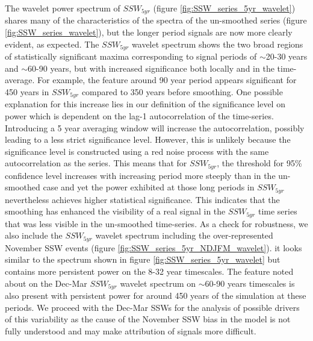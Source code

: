 The wavelet power spectrum of $SSW_{5yr}$ (figure \ref{fig:SSW_series_5yr_wavelet}) shares many of the characteristics of the spectra of the un-smoothed series (figure \ref{fig:SSW_series_wavelet}), but the longer period signals are now more clearly evident, as expected. The $SSW_{5yr}$ wavelet spectrum shows the two broad regions of statistically significant maxima corresponding to signal periods of $\sim$20-30 years and $\sim$60-90 years, but with increased significance both locally and in the time-average. For example, the feature around 90 year period appears significant for 450 years in $SSW_{5yr}$ compared to 350 years before smoothing. One possible explanation for this increase lies in our definition of the significance level on power which is dependent on the lag-1 autocorrelation of the time-series. Introducing a 5 year averaging window will increase the autocorrelation, possibly leading to a less strict significance level. However, this is unlikely because the significance level is constructed using a red noise process with the same autocorrelation as the series. This means that for $SSW_{5yr}$, the threshold for 95\% confidence level increases with increasing period more steeply than in the un-smoothed case and yet the power exhibited at those long periods in $SSW_{5yr}$ nevertheless achieves higher statistical significance. This indicates that the smoothing has enhanced the visibility of a real signal in the $SSW_{5yr}$ time series that was less visible in the un-smoothed time-series. As a check for robustness, we also include the $SSW_{5yr}$ wavelet spectrum including the over-represented November SSW events (figure \ref{fig:SSW_series_5yr_NDJFM_wavelet}). it looks similar to  the spectrum shown in figure \ref{fig:SSW_series_5yr_wavelet} but contains more persistent power on the 8-32 year timescales. The feature noted about on the Dec-Mar $SSW_{5yr}$ wavelet spectrum on $\sim$60-90 years timescales is also present with persistent power for around 450 years of the simulation at these periods. We proceed with the Dec-Mar SSWs for the analysis of possible drivers of this variability as the cause of the November SSW bias in the model is not fully understood and may make attribution of signals more difficult. 


